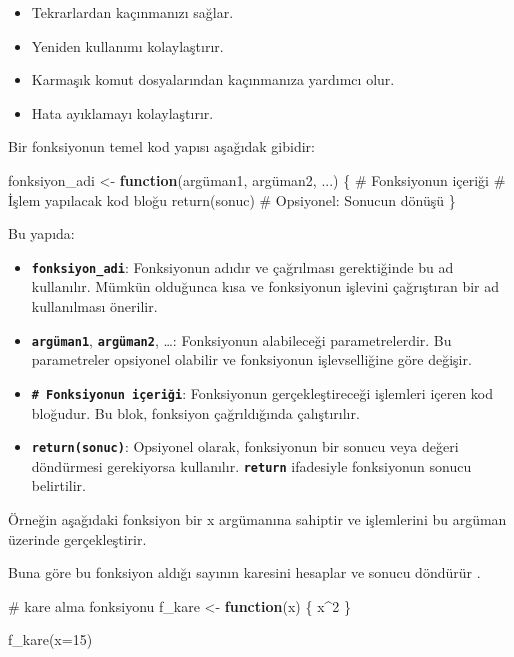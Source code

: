 \documentclass[
  letterpaper,
  DIV=11,
  numbers=noendperiod]{scrreprt}
\newenvironment{Shaded}{\begin{snugshade}}{\end{snugshade}}
\newcommand{\AttributeTok}[1]{\textcolor[rgb]{0.40,0.45,0.13}{#1}}
\newcommand{\CommentTok}[1]{\textcolor[rgb]{0.37,0.37,0.37}{#1}}
\newcommand{\ControlFlowTok}[1]{\textcolor[rgb]{0.00,0.23,0.31}{\textbf{#1}}}
\newcommand{\DecValTok}[1]{\textcolor[rgb]{0.68,0.00,0.00}{#1}}
\newcommand{\FunctionTok}[1]{\textcolor[rgb]{0.28,0.35,0.67}{#1}}
\newcommand{\NormalTok}[1]{\textcolor[rgb]{0.00,0.23,0.31}{#1}}
\newcommand{\OtherTok}[1]{\textcolor[rgb]{0.00,0.23,0.31}{#1}}
\newcommand{\SpecialCharTok}[1]{\textcolor[rgb]{0.37,0.37,0.37}{#1}}
\begin{document}
\begin{itemize}
\item
  Tekrarlardan kaçınmanızı sağlar.
\item
  Yeniden kullanımı kolaylaştırır.
\item
  Karmaşık komut dosyalarından kaçınmanıza yardımcı olur.
\item
  Hata ayıklamayı kolaylaştırır.
\end{itemize}

Bir fonksiyonun temel kod yapısı aşağıdak gibidir:

\begin{Shaded}
\begin{Highlighting}[]
\NormalTok{fonksiyon\_adi }\OtherTok{\textless{}{-}} \ControlFlowTok{function}\NormalTok{(argüman1, argüman2, ...) \{}
  \CommentTok{\# Fonksiyonun içeriği}
  \CommentTok{\# İşlem yapılacak kod bloğu}
  \FunctionTok{return}\NormalTok{(sonuc)  }\CommentTok{\# Opsiyonel: Sonucun dönüşü}
\NormalTok{\}}
\end{Highlighting}
\end{Shaded}

Bu yapıda:

\begin{itemize}
\item
  \textbf{\texttt{fonksiyon\_adi}}: Fonksiyonun adıdır ve çağrılması
  gerektiğinde bu ad kullanılır. Mümkün olduğunca kısa ve fonksiyonun
  işlevini çağrıştıran bir ad kullanılması önerilir.
\item
  \textbf{\texttt{argüman1}}, \textbf{\texttt{argüman2}}, \ldots:
  Fonksiyonun alabileceği parametrelerdir. Bu parametreler opsiyonel
  olabilir ve fonksiyonun işlevselliğine göre değişir.
\item
  \textbf{\texttt{\#\ Fonksiyonun\ içeriği}}: Fonksiyonun
  gerçekleştireceği işlemleri içeren kod bloğudur. Bu blok, fonksiyon
  çağrıldığında çalıştırılır.
\item
  \textbf{\texttt{return(sonuc)}}: Opsiyonel olarak, fonksiyonun bir
  sonucu veya değeri döndürmesi gerekiyorsa kullanılır.
  \textbf{\texttt{return}} ifadesiyle fonksiyonun sonucu belirtilir.
\end{itemize}

Örneğin aşağıdaki fonksiyon bir x argümanına sahiptir ve işlemlerini bu
argüman üzerinde gerçekleştirir.

Buna göre bu fonksiyon aldığı sayının karesini hesaplar ve sonucu
döndürür .

\begin{Shaded}
\begin{Highlighting}[]
\CommentTok{\# kare alma fonksiyonu}
\NormalTok{f\_kare }\OtherTok{\textless{}{-}} \ControlFlowTok{function}\NormalTok{(x) \{}
\NormalTok{   x}\SpecialCharTok{\^{}}\DecValTok{2}
\NormalTok{ \}}

\FunctionTok{f\_kare}\NormalTok{(}\AttributeTok{x=}\DecValTok{15}\NormalTok{)}
\end{Highlighting}
\end{Shaded}
\end{document}
